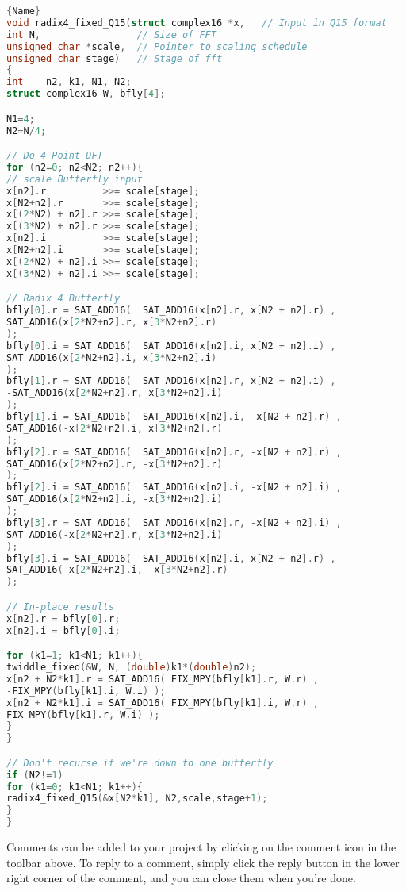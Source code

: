 \documentclass[a4paper]{article}
\begin{document}
\begin{lstlisting}[caption=code 5,frame=tlrb, language=C]{Name}
void radix4_fixed_Q15(struct complex16 *x,   // Input in Q15 format 
int N,                 // Size of FFT
unsigned char *scale,  // Pointer to scaling schedule
unsigned char stage)   // Stage of fft
{ 
int    n2, k1, N1, N2;
struct complex16 W, bfly[4];

N1=4;
N2=N/4;

// Do 4 Point DFT  
for (n2=0; n2<N2; n2++){
// scale Butterfly input
x[n2].r          >>= scale[stage];
x[N2+n2].r       >>= scale[stage];
x[(2*N2) + n2].r >>= scale[stage];
x[(3*N2) + n2].r >>= scale[stage];
x[n2].i          >>= scale[stage];
x[N2+n2].i       >>= scale[stage];
x[(2*N2) + n2].i >>= scale[stage];
x[(3*N2) + n2].i >>= scale[stage];

// Radix 4 Butterfly 
bfly[0].r = SAT_ADD16(  SAT_ADD16(x[n2].r, x[N2 + n2].r) , 
SAT_ADD16(x[2*N2+n2].r, x[3*N2+n2].r) 
);
bfly[0].i = SAT_ADD16(  SAT_ADD16(x[n2].i, x[N2 + n2].i) , 
SAT_ADD16(x[2*N2+n2].i, x[3*N2+n2].i) 
);
bfly[1].r = SAT_ADD16(  SAT_ADD16(x[n2].r, x[N2 + n2].i) , 
-SAT_ADD16(x[2*N2+n2].r, x[3*N2+n2].i) 
);
bfly[1].i = SAT_ADD16(  SAT_ADD16(x[n2].i, -x[N2 + n2].r) , 
SAT_ADD16(-x[2*N2+n2].i, x[3*N2+n2].r)
);
bfly[2].r = SAT_ADD16(  SAT_ADD16(x[n2].r, -x[N2 + n2].r) , 
SAT_ADD16(x[2*N2+n2].r, -x[3*N2+n2].r)
);
bfly[2].i = SAT_ADD16(  SAT_ADD16(x[n2].i, -x[N2 + n2].i) , 
SAT_ADD16(x[2*N2+n2].i, -x[3*N2+n2].i)
);
bfly[3].r = SAT_ADD16(  SAT_ADD16(x[n2].r, -x[N2 + n2].i) ,
SAT_ADD16(-x[2*N2+n2].r, x[3*N2+n2].i)
);
bfly[3].i = SAT_ADD16(  SAT_ADD16(x[n2].i, x[N2 + n2].r) ,
SAT_ADD16(-x[2*N2+n2].i, -x[3*N2+n2].r)
);

// In-place results 
x[n2].r = bfly[0].r;
x[n2].i = bfly[0].i;

for (k1=1; k1<N1; k1++){
twiddle_fixed(&W, N, (double)k1*(double)n2);
x[n2 + N2*k1].r = SAT_ADD16( FIX_MPY(bfly[k1].r, W.r) , 
-FIX_MPY(bfly[k1].i, W.i) );
x[n2 + N2*k1].i = SAT_ADD16( FIX_MPY(bfly[k1].i, W.r) , 
FIX_MPY(bfly[k1].r, W.i) );
}
}

// Don't recurse if we're down to one butterfly 
if (N2!=1)
for (k1=0; k1<N1; k1++){
radix4_fixed_Q15(&x[N2*k1], N2,scale,stage+1);
}
}
\end{lstlisting}

Comments can be added to your project by clicking on the comment icon in the toolbar above. %
%
%
To reply to a comment, simply click the reply button in the lower right corner of the comment, and you can close them when you're done.
\end{document}
